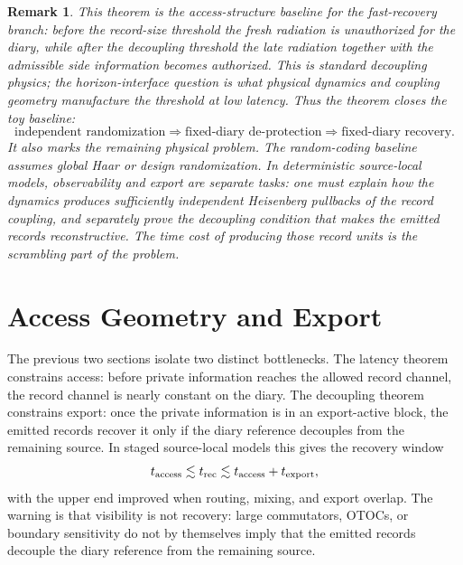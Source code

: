 \documentclass[11pt]{article}
\newtheorem{remark}{Remark}
\begin{document}
\begin{remark}
This theorem is the access-structure baseline for the fast-recovery
branch: before the record-size threshold the fresh radiation is
unauthorized for the diary, while after the decoupling threshold the
late radiation together with the admissible side information becomes
authorized.  This is standard decoupling physics; the horizon-interface
question is what physical dynamics and coupling geometry manufacture the
threshold at low latency.  Thus the theorem closes the toy baseline:
\begin{equation}
  \text{independent randomization}
  \Longrightarrow
  \text{fixed-diary de-protection}
  \Longrightarrow
  \text{fixed-diary recovery}.
\end{equation}
It also marks the remaining physical problem.  The random-coding
baseline assumes global Haar or design randomization.  In deterministic
source-local models, observability and export are separate tasks: one
must explain how the dynamics produces sufficiently independent
Heisenberg pullbacks of the record coupling, and separately prove the
decoupling condition that makes the emitted records reconstructive.  The
time cost of producing those record units is the scrambling part of the
problem.
\end{remark}

\section{Access Geometry and Export}

The previous two sections isolate two distinct bottlenecks.  The
latency theorem constrains access: before private information reaches
the allowed record channel, the record channel is nearly constant on the
diary.  The decoupling theorem constrains export: once the private
information is in an export-active block, the emitted records recover it
only if the diary reference decouples from the remaining source.
In staged source-local models this gives the recovery window
\begin{equation}
  t_{\rm access}
  \lesssim
  t_{\rm rec}
  \lesssim
  t_{\rm access}+t_{\rm export},
\end{equation}
with the upper end improved when routing, mixing, and export overlap.
The warning is that visibility is not recovery: large commutators,
OTOCs, or boundary sensitivity do not by themselves imply that the
emitted records decouple the diary reference from the remaining source.
\end{document}
